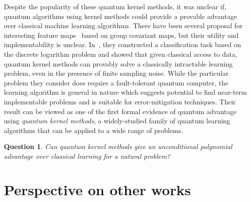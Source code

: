 \documentclass[11pt]{article}
\newtheorem{question}{Question}
\begin{document}
Despite the popularity of these quantum kernel methods, it was unclear if, quantum algorithms using kernel methods could provide  a provable advantage over classical machine learning algorithms. There have been several proposal for interesting feature maps~\cite{glick2021covariant,Havlicek2019} based on group covariant maps, but their utility and implementability is unclear.  In~\cite{liu2021rigorous}, they constructed a classification task based on the discrete logarithm problem and showed that given classical access to data, quantum kernel methods can provably solve a classically intractable learning problem, even in the presence of finite sampling noise. While the particular problem they consider does require a fault-tolerant quantum computer, the learning algorithm is general in nature which suggests potential to find near-term implementable problems and is suitable for error-mitigation techniques. Their result can be viewed as one of the first formal evidence of quantum advantage using \emph{quantum kernel methods}, a widely-studied family of quantum learning algorithms that can be applied to a wide range of problems. 



\begin{question}
Can quantum kernel methods give an unconditional polynomial advantage over classical learning for a natural problem?
\end{question}

\section{Perspective on other works}
\label{sec:prospective}
\end{document}
